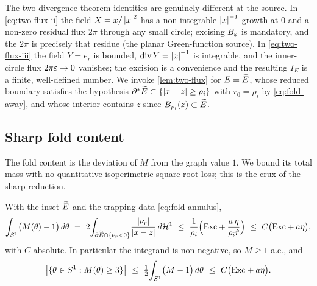 \begin{remark}\label{rem:singularity}
The two divergence-theorem identities are genuinely different at the source.
In \eqref{eq:two-flux-ii} the field $X=x/\left\lvert x\right\rvert^2$ has a non-integrable
$\left\lvert x\right\rvert^{-1}$ growth at $0$ and a non-zero residual flux $2\pi$ through any
small circle; excising $B_\varepsilon$ is mandatory, and the $2\pi$ is precisely
that residue (the planar Green-function source). In \eqref{eq:two-flux-iii}
the field $Y=e_r$ is bounded, $\operatorname{div} Y=\left\lvert x\right\rvert^{-1}$ is integrable, and the
inner-circle flux $2\pi\varepsilon\to0$ vanishes; the excision is a convenience and
the resulting $I_E$ is a finite, well-defined number. We invoke
\cref{lem:two-flux} for $E=\widetilde{E}$, whose reduced boundary satisfies the
hypothesis $\partial^*\widetilde{E}\subset\{\left\lvert x-z\right\rvert\ge\rho_i\}$ with $r_0=\rho_i$
by \eqref{eq:fold-away}, and whose interior contains $z$ since
$B_{\rho_i}(z)\subset\widetilde{E}$.
\end{remark}

\subsection{Sharp fold content}

The fold content is the deviation of $M$ from the graph value $1$. We bound
its total mass with no quantitative-isoperimetric square-root loss; this is
the crux of the sharp reduction.

\begin{proposition}\label{prop:fold}
With the inset $\widetilde{E}$ and the trapping data \eqref{eq:fold-annulus},
\begin{equation}\label{eq:foldsharp}
   \int_{S^1}\bigl(M(\theta)-1\bigr)\,d\theta
   \ =\ 2\!\int_{\partial\widetilde{E}\cap\{\nu_r<0\}}\!
        \frac{\left\lvert\nu_r\right\rvert}{\left\lvert x-z\right\rvert}\,d\mathcal{H}^1
   \ \le\ \frac1{\rho_i}\Bigl(\mathrm{Exc}+\frac{a\,\eta}{\rho_i\hat r}\Bigr)
   \ \le\ C\bigl(\mathrm{Exc}+a\eta\bigr),
\end{equation}
with $C$ absolute. In particular the integrand is non-negative, so
$M\ge1$ a.e., and
\begin{equation}\label{eq:foldangles}
   \bigl|\{\theta\in S^1:M(\theta)\ge3\}\bigr|
   \ \le\ \tfrac12\!\int_{S^1}\bigl(M-1\bigr)\,d\theta
   \ \le\ C\bigl(\mathrm{Exc}+a\eta\bigr).
\end{equation}
\end{proposition}

